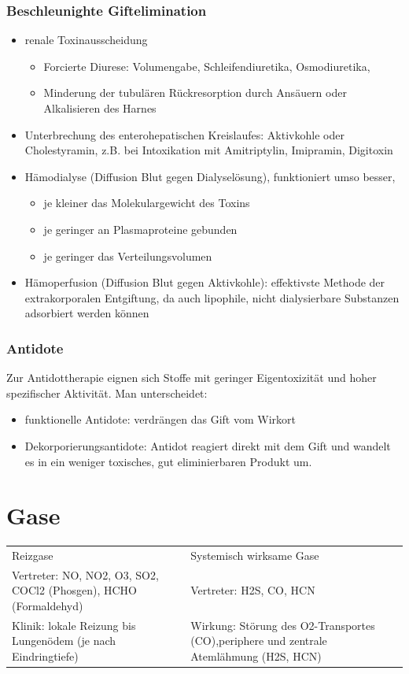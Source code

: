 \documentclass[10pt,a4paper]{report}
\begin{document}
\subsubsection{Beschleunighte Giftelimination} %
\label{ssub:beschleunighte_giftelimination}
\begin{itemize}
	\item renale Toxinausscheidung
	\begin{itemize}
		\item Forcierte Diurese: Volumengabe, Schleifendiuretika, Osmodiuretika,
		\item Minderung der tubulären Rückresorption durch Ansäuern oder Alkalisieren des Harnes
	\end{itemize}
	\item Unterbrechung des enterohepatischen Kreislaufes: Aktivkohle oder Cholestyramin, z.B. bei Intoxikation mit Amitriptylin, Imipramin, Digitoxin
	\item Hämodialyse (Diffusion Blut gegen Dialyselösung), funktioniert umso besser,
	\begin{itemize}
		\item je kleiner das Molekulargewicht des Toxins
		\item je geringer an Plasmaproteine gebunden
		\item je geringer das Verteilungsvolumen
	\end{itemize}
	\item Hämoperfusion (Diffusion Blut gegen Aktivkohle): effektivste Methode der extrakorporalen Entgiftung, da auch lipophile, nicht dialysierbare Substanzen adsorbiert werden können
\end{itemize}
\subsubsection{Antidote} %
\label{ssub:antidote}
Zur Antidottherapie eignen sich Stoffe mit geringer Eigentoxizität und hoher spezifischer Aktivität. Man unterscheidet:
\begin{itemize}
	\item funktionelle Antidote: verdrängen das Gift vom Wirkort
	\item Dekorporierungsantidote: Antidot reagiert direkt mit dem Gift und wandelt es in ein weniger toxisches, gut eliminierbaren Produkt um.
\end{itemize}
\section{Gase} %
\label{sec:gase}
\begin{tabularx}{\textwidth}{XX}
Reizgase&Systemisch wirksame Gase\\
Vertreter: NO, NO2, O3, SO2, COCl2 (Phosgen), HCHO (Formaldehyd)&Vertreter: H2S, CO, HCN\\
Klinik: lokale Reizung bis Lungenödem (je nach Eindringtiefe)&Wirkung: 
Störung des O2-Transportes (CO),periphere und zentrale Atemlähmung (H2S, HCN) \\
\end{tabularx}
\end{document}
